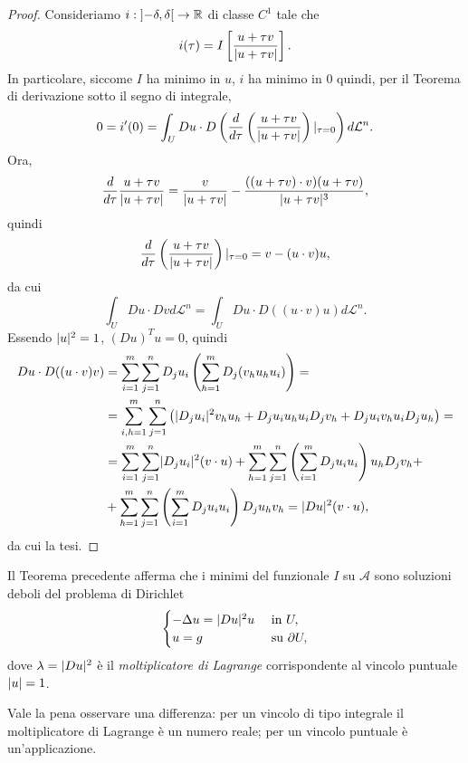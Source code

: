 \begin{proof}
	Consideriamo $i: \left] -\delta,\delta\right[ \to \mathbb{R}$ di classe $C^1$ tale che 
	\[ i(\tau) = I\left[ \frac{u+\tau v}{\lvert u+\tau v\rvert}\right] . \]
	In particolare, siccome $I$ ha minimo in $u$, $i$ ha minimo in $0$ quindi, per il Teorema di derivazione sotto il segno di integrale,
	\[ 0 = i'(0) = \int_U Du \cdot D\left( \frac{d}{d\tau}\left(\frac{u+\tau v}{\lvert u+\tau v\rvert}\right) |_{\tau=0}\right) d\mathcal{L}^n.\]
	Ora, 
	\[ \frac{d}{d\tau}\frac{u+\tau v}{\lvert u+\tau v\rvert} = \frac{v}{\lvert u+\tau v\rvert} - \frac{((u+\tau v)\cdot v)(u+\tau v)}{\lvert u+\tau v\rvert^3}, \]
	quindi 
	\[ \frac{d}{d\tau}\left( \frac{u+\tau v}{\lvert u+\tau v\rvert}\right) |_{\tau=0} = v- (u\cdot v)u, \]
	da cui
	\[ \int_U Du \cdot Dv d\mathcal{L}^n = \int_U Du \cdot D((u\cdot v)u) d\mathcal{L}^n.\]
	Essendo $\lvert u\rvert^2 = 1$, $(Du)^T u = 0$, quindi 
	\begin{align*}
	Du\cdot D((u\cdot v)v) &= \sum_{i=1}^{m}\sum_{j=1}^{n} D_j u_i \left( \sum_{h=1}^{m}D_j(v_hu_hu_i)\right)  = \\
	&= \sum_{i,h=1}^{m} \sum_{j=1}^{n} \left( \lvert D_ju_i\rvert^2v_hu_h + D_ju_i u_h u_iD_jv_h + D_ju_i v_h u_iD_ju_h\right) =\\
	&= \sum_{i=1}^m\sum_{j=1}^{n}\lvert D_ju_i\rvert^2(v\cdot u) + \sum_{h=1}^{m}\sum_{j=1}^{n}\left( \sum_{i=1}^{m}D_ju_i u_i\right) u_hD_jv_h + \\
	&+\sum_{h=1}^{m}\sum_{j=1}^{n}\left( \sum_{i=1}^{m}D_ju_i u_i\right) D_ju_hv_h = \lvert Du\rvert^2(v\cdot u),
	\end{align*}
	da cui la tesi.
\end{proof}
\begin{osservazione}
Il Teorema precedente afferma che i minimi del funzionale $I$ su $\mathcal{A}$ sono soluzioni deboli del problema di Dirichlet
	\[ \begin{cases}
		-\Delta u = \lvert Du\rvert^2u & \textup{ in } U,\\
		u = g & \textup{ su } \partial U,
	\end{cases} \]
	dove $\lambda = \lvert Du\rvert^2$ è il \emph{moltiplicatore di Lagrange} corrispondente al vincolo puntuale $\lvert u\rvert = 1$.
\end{osservazione}
Vale la pena osservare una differenza: per un vincolo di tipo integrale il moltiplicatore di Lagrange è un numero reale; per un vincolo puntuale è un'applicazione.
